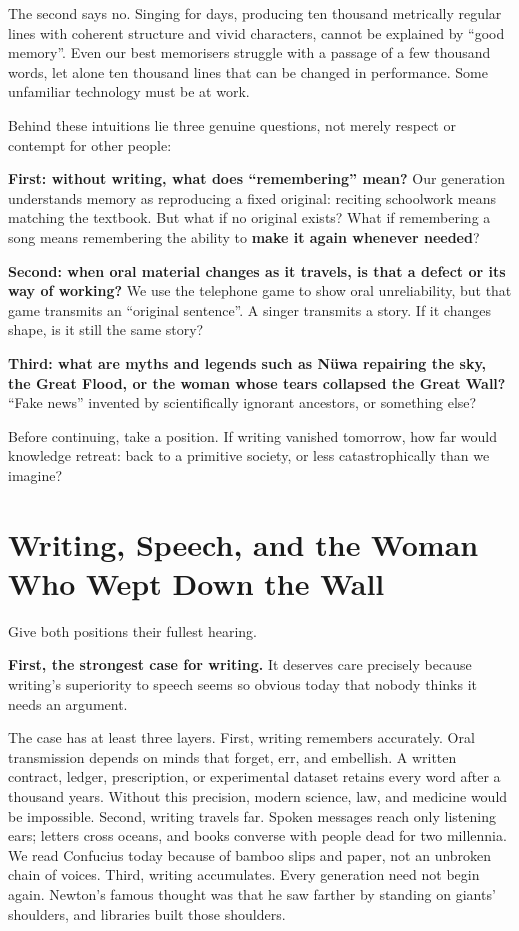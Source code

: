 The second says no. Singing for days, producing ten thousand metrically regular lines with coherent structure and vivid characters, cannot be explained by ``good memory''. Even our best memorisers struggle with a passage of a few thousand words, let alone ten thousand lines that can be changed in performance. Some unfamiliar technology must be at work.

Behind these intuitions lie three genuine questions, not merely respect or contempt for other people:

\textbf{First: without writing, what does ``remembering'' mean?} Our generation understands memory as reproducing a fixed original: reciting schoolwork means matching the textbook. But what if no original exists? What if remembering a song means remembering the ability to \textbf{make it again whenever needed}?

\textbf{Second: when oral material changes as it travels, is that a defect or its way of working?} We use the telephone game to show oral unreliability, but that game transmits an ``original sentence''. A singer transmits a story. If it changes shape, is it still the same story?

\textbf{Third: what are myths and legends such as Nüwa repairing the sky, the Great Flood, or the woman whose tears collapsed the Great Wall?} ``Fake news'' invented by scientifically ignorant ancestors, or something else?

Before continuing, take a position. If writing vanished tomorrow, how far would knowledge retreat: back to a primitive society, or less catastrophically than we imagine?

\section[Writing, Speech, and a Weeping Woman]{Writing, Speech, and the Woman Who Wept Down the Wall}
Give both positions their fullest hearing.

\textbf{First, the strongest case for writing.} It deserves care precisely because writing's superiority to speech seems so obvious today that nobody thinks it needs an argument.

The case has at least three layers. First, writing remembers accurately. Oral transmission depends on minds that forget, err, and embellish. A written contract, ledger, prescription, or experimental dataset retains every word after a thousand years. Without this precision, modern science, law, and medicine would be impossible. Second, writing travels far. Spoken messages reach only listening ears; letters cross oceans, and books converse with people dead for two millennia. We read Confucius today because of bamboo slips and paper, not an unbroken chain of voices. Third, writing accumulates. Every generation need not begin again. Newton's famous thought was that he saw farther by standing on giants' shoulders, and libraries built those shoulders.

